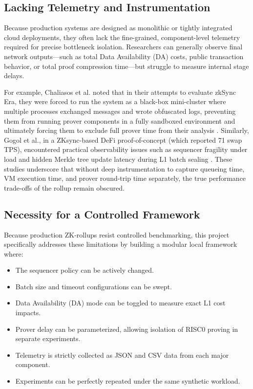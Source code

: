 \subsection{Lacking Telemetry and Instrumentation}
Because production systems are designed as monolithic or tightly integrated cloud deployments, they often lack the fine-grained, component-level telemetry required for precise bottleneck isolation. Researchers can generally observe final network outputs---such as total Data Availability (DA) costs, public transaction behavior, or total proof compression time---but struggle to measure internal stage delays.

For example, Chaliasos et al. noted that in their attempts to evaluate zkSync Era, they were forced to run the system as a black-box mini-cluster where multiple processes exchanged messages and wrote obfuscated logs, preventing them from running prover components in a fully sandboxed environment and ultimately forcing them to exclude full prover time from their analysis \citep{chaliasos2024analyzing}. Similarly, Gogol et al., in a ZKsync-based DeFi proof-of-concept (which reported 71 swap TPS), encountered practical observability issues such as sequencer fragility under load and hidden Merkle tree update latency during L1 batch sealing \citep{gogol2025defi}. These studies underscore that without deep instrumentation to capture queueing time, VM execution time, and prover round-trip time separately, the true performance trade-offs of the rollup remain obscured.

\subsection{Necessity for a Controlled Framework}
Because production ZK-rollups resist controlled benchmarking, this project specifically addresses these limitations by building a modular local framework where:
\begin{itemize}
    \item The sequencer policy can be actively changed.
    \item Batch size and timeout configurations can be swept.
    \item Data Availability (DA) mode can be toggled to measure exact L1 cost impacts.
    \item Prover delay can be parameterized, allowing isolation of RISC0 proving in separate experiments.
    \item Telemetry is strictly collected as JSON and CSV data from each major component.
    \item Experiments can be perfectly repeated under the same synthetic workload.
\end{itemize}
